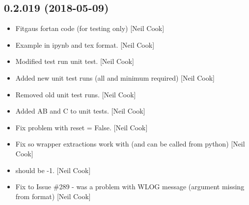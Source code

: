 \documentclass[a4paper,10pt,english]{report}
\begin{document}
\subsection{0.2.019 (2018-05-09)}
\label{\detokenize{misc/changelog:id441}}\begin{itemize}
\item {} 
Fitgaus fortan code (for testing only) {[}Neil Cook{]}

\item {} 
Example in ipynb and tex format. {[}Neil Cook{]}

\item {} 
Modified test run unit test. {[}Neil Cook{]}

\item {} 
Added new unit test runs (all and minimum required) {[}Neil Cook{]}

\item {} 
Removed old unit test runs. {[}Neil Cook{]}

\item {} 
Added  AB and C to unit tests. {[}Neil Cook{]}

\item {} 
Fix problem with reset = False. {[}Neil Cook{]}

\item {} 
Fix so wrapper extractions work with  (and can be called
from python) {[}Neil Cook{]}

\item {} 
 should be -1. {[}Neil Cook{]}

\item {} 
Fix to Issue \#289 - was a problem with WLOG message (argument missing
from format) {[}Neil Cook{]}

\end{itemize}
\end{document}
